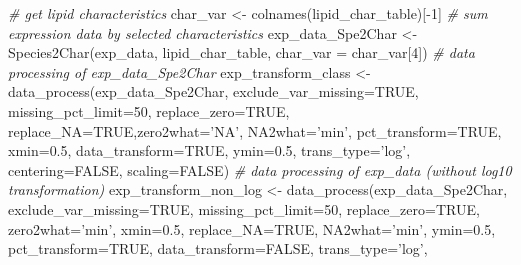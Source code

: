 \documentclass[]{article}
\newcommand{\hlnum}[1]{\textcolor[rgb]{0.816,0.125,0.439}{#1}}%
\newcommand{\hlstr}[1]{\textcolor[rgb]{0.251,0.627,0.251}{#1}}%
\newcommand{\hlcom}[1]{\textcolor[rgb]{0.502,0.502,0.502}{\textit{#1}}}%
\newcommand{\hlopt}[1]{\textcolor[rgb]{0,0,0}{#1}}%
\newcommand{\hlstd}[1]{\textcolor[rgb]{0.251,0.251,0.251}{#1}}%
\newcommand{\hlkwc}[1]{\textcolor[rgb]{0.251,0.251,0.251}{#1}}%
\newcommand{\hlkwd}[1]{\textcolor[rgb]{0.878,0.439,0.125}{#1}}%
\newenvironment{Shaded}{\begin{myshaded}}{\end{myshaded}}
\newcommand{\KeywordTok}[1]{\hlkwd{#1}}
\newcommand{\DataTypeTok}[1]{\hlkwc{#1}}
\newcommand{\DecValTok}[1]{\hlnum{#1}}
\newcommand{\FloatTok}[1]{\hlnum{#1}}
\newcommand{\StringTok}[1]{\hlstr{#1}}
\newcommand{\CommentTok}[1]{\hlcom{#1}}
\newcommand{\OtherTok}[1]{{#1}}
\newcommand{\OperatorTok}[1]{\hlopt{#1}}
\newcommand{\NormalTok}[1]{\hlstd{#1}}
\begin{document}
\begin{Shaded}
\begin{Highlighting}[]
\CommentTok{# get lipid characteristics}
\NormalTok{char_var <-}\StringTok{ }\KeywordTok{colnames}\NormalTok{(lipid_char_table)[}\OperatorTok{-}\DecValTok{1}\NormalTok{]}
\CommentTok{# sum expression data by selected characteristics}
\NormalTok{exp_data_Spe2Char <-}\StringTok{ }\KeywordTok{Species2Char}\NormalTok{(exp_data, lipid_char_table,}
                                  \DataTypeTok{char_var =}\NormalTok{ char_var[}\DecValTok{4}\NormalTok{])}
\CommentTok{# data processing of exp_data_Spe2Char}
\NormalTok{exp_transform_class <-}\StringTok{ }\KeywordTok{data_process}\NormalTok{(exp_data_Spe2Char, }
                                    \DataTypeTok{exclude_var_missing=}\OtherTok{TRUE}\NormalTok{,}
                                    \DataTypeTok{missing_pct_limit=}\DecValTok{50}\NormalTok{, }\DataTypeTok{replace_zero=}\OtherTok{TRUE}\NormalTok{,}
                                    \DataTypeTok{replace_NA=}\OtherTok{TRUE}\NormalTok{,}\DataTypeTok{zero2what=}\StringTok{'NA'}\NormalTok{,}
                                    \DataTypeTok{NA2what=}\StringTok{'min'}\NormalTok{, }\DataTypeTok{pct_transform=}\OtherTok{TRUE}\NormalTok{, }
                                    \DataTypeTok{xmin=}\FloatTok{0.5}\NormalTok{, }\DataTypeTok{data_transform=}\OtherTok{TRUE}\NormalTok{, }
                                    \DataTypeTok{ymin=}\FloatTok{0.5}\NormalTok{, }\DataTypeTok{trans_type=}\StringTok{'log'}\NormalTok{, }
                                    \DataTypeTok{centering=}\OtherTok{FALSE}\NormalTok{, }\DataTypeTok{scaling=}\OtherTok{FALSE}\NormalTok{)}
\CommentTok{# data processing of exp_data (without log10 transformation)}
\NormalTok{exp_transform_non_log <-}\StringTok{ }\KeywordTok{data_process}\NormalTok{(exp_data_Spe2Char,}
                                      \DataTypeTok{exclude_var_missing=}\OtherTok{TRUE}\NormalTok{,}
                                      \DataTypeTok{missing_pct_limit=}\DecValTok{50}\NormalTok{,}
                                      \DataTypeTok{replace_zero=}\OtherTok{TRUE}\NormalTok{, }\DataTypeTok{zero2what=}\StringTok{'min'}\NormalTok{,}
                                      \DataTypeTok{xmin=}\FloatTok{0.5}\NormalTok{, }\DataTypeTok{replace_NA=}\OtherTok{TRUE}\NormalTok{, }\DataTypeTok{NA2what=}\StringTok{'min'}\NormalTok{,}
                                      \DataTypeTok{ymin=}\FloatTok{0.5}\NormalTok{, }\DataTypeTok{pct_transform=}\OtherTok{TRUE}\NormalTok{,}
                                      \DataTypeTok{data_transform=}\OtherTok{FALSE}\NormalTok{, }\DataTypeTok{trans_type=}\StringTok{'log'}\NormalTok{,}

\end{Highlighting}
\end{Shaded}
\end{document}
